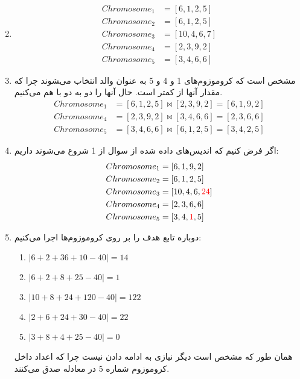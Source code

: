 \begin{enumerate}
\begin{align*}
    \end{align*}
    \item \begin{align*}
        Chromosome_1 &= [6, 1, 2, 5] \\
        Chromosome_2 &= [6, 1, 2, 5] \\
        Chromosome_3 &= [10, 4, 6, 7] \\
        Chromosome_4 &= [2, 3, 9, 2] \\
        Chromosome_5 &= [3, 4, 6, 6]
    \end{align*}
    \item مشخص است که کروموزوم‌های 1 و 4 و 5 به عنوان والد انتخاب می‌‍شوند چرا که مقدار آنها از  کمتر است.
    حال آنها را دو به دو با هم  می‌کنیم.
    \begin{align*}
        Chromosome_1 &= [6, 1, 2, 5] \bowtie [2, 3, 9, 2] = [6, 1, 9, 2]\\
        Chromosome_4 &= [2, 3, 9, 2] \bowtie [3, 4, 6, 6] = [2, 3, 6, 6]\\
        Chromosome_5 &= [3, 4, 6, 6] \bowtie [6, 1, 2, 5] = [3, 4, 2, 5]
    \end{align*}
    \item اگر فرض کنیم که اندیس‌های داده شده از سوال از 1 شروع می‌شوند داریم: \begin{align*}
        Chromosome_1 &= [6, 1, 9, 2] \\
        Chromosome_2 &= [6, 1, 2, 5] \\
        Chromosome_3 &= [10, 4, 6, {\color{red} 24}] \\
        Chromosome_4 &= [2, 3, 6, 6] \\
        Chromosome_5 &= [3, 4, {\color{red} 1}, 5]
    \end{align*}
    \item دوباره تابع هدف را بر روی کروموزوم‌ها اجرا می‌کنیم:
    \begin{enumerate}
        \item $|6 + 2 + 36 + 10 - 40| = 14$
        \item $|6 + 2 + 8 + 25 - 40| = 1$
        \item $|10 + 8 + 24 + 120 - 40| = 122$
        \item $|2 + 6 + 24 + 30 - 40| = 22$
        \item $|3 + 8 + 4 + 25 - 40| = 0$
    \end{enumerate}
    همان طور که مشخص است دیگر نیازی به ادامه دادن نیست چرا که اعداد داخل کروموزوم شماره 5 در معادله صدق می‌کنند.
\end{enumerate}